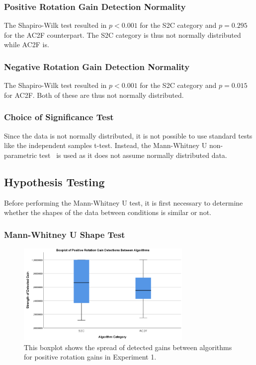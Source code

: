 \subsubsection{Positive Rotation Gain Detection Normality}
The Shapiro-Wilk test resulted in $p < 0.001$ for the S2C category and $p = 0.295$ for the AC2F counterpart. The S2C category is thus not normally distributed while AC2F is. 

\subsubsection{Negative Rotation Gain Detection Normality}
The Shapiro-Wilk test resulted in $p < 0.001$ for the S2C category and $p = 0.015$ for AC2F. Both of these are thus not normally distributed.  

\subsubsection{Choice of Significance Test}
Since the data is not normally distributed, it is not possible to use standard tests like the independent samples t-test. Instead, the Mann-Whitney U non-parametric test~\cite{MWUTest} is used as it does not assume normally distributed data. 
   
\subsection{Hypothesis Testing}
Before performing the Mann-Whitney U test, it is first necessary to determine whether the shapes of the data between conditions is similar or not. 
\subsubsection{Mann-Whitney U Shape Test}
\begin{figure}[tbph]
    \centering
    \includegraphics[width=0.75\textwidth]{figures/graphs/PosRotationDetectionBoxplot.png}
    \caption[Boxplot on Positive Rotation Detections in Experiment 1]{This boxplot shows the spread of detected gains between algorithms for positive rotation gains in Experiment 1.}
    \label{fig:posRotEx1Boxplot}
\end{figure}


